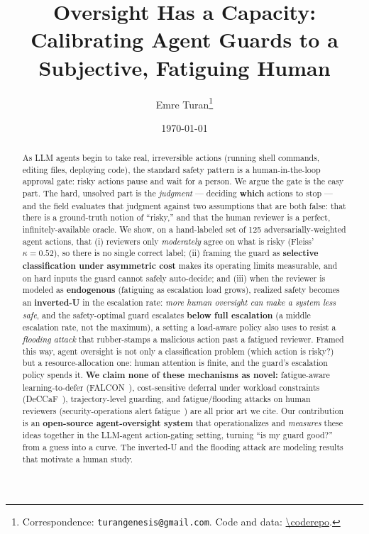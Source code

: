 \documentclass[11pt]{article}
\title{\textbf{Oversight Has a Capacity:\\ Calibrating Agent Guards to a Subjective, Fatiguing Human}}
\author{Emre Turan\thanks{Correspondence: \texttt{turangenesis@gmail.com}. Code and data: \url{\coderepo}.}}
\affil{Independent Researcher}
\date{\today}
\begin{document}
\maketitle

\begin{abstract}
As LLM agents begin to take real, irreversible actions (running shell commands, editing files,
deploying code), the standard safety pattern is a human-in-the-loop approval gate: risky actions
pause and wait for a person. We argue the gate is the easy part. The hard, unsolved part is the
\emph{judgment} --- deciding \textbf{which} actions to stop --- and the field evaluates that judgment
against two assumptions that are both false: that there is a ground-truth notion of ``risky,'' and
that the human reviewer is a perfect, infinitely-available oracle. We show, on a hand-labeled set of
125 adversarially-weighted agent actions, that (i) reviewers only \emph{moderately} agree on what is
risky (Fleiss' $\kappa = 0.52$), so there is no single correct label; (ii) framing the guard as
\textbf{selective classification under asymmetric cost} makes its operating limits measurable, and on
hard inputs the guard cannot safely auto-decide; and (iii) when the reviewer is modeled as
\textbf{endogenous} (fatiguing as escalation load grows), realized safety becomes an
\textbf{inverted-U} in the escalation rate: \emph{more human oversight can make a system less safe},
and the safety-optimal guard escalates \textbf{below full escalation} (a middle escalation rate, not
the maximum), a setting a load-aware policy also uses to resist a \emph{flooding attack} that
rubber-stamps a malicious action past a fatigued reviewer. Framed this way, agent oversight is not
only a classification problem (which action is risky?) but a resource-allocation one: human attention
is finite, and the guard's escalation policy spends it. \textbf{We claim none of these mechanisms
as novel:} fatigue-aware learning-to-defer (FALCON~\cite{falcon}), cost-sensitive deferral under workload
constraints (DeCCaF~\cite{deccaf}),
trajectory-level guarding, and fatigue/flooding attacks on human reviewers (security-operations alert
fatigue~\cite{tariq25}) are all prior art we cite. Our contribution is an \textbf{open-source
agent-oversight system} that operationalizes and \emph{measures} these ideas together in the
LLM-agent action-gating setting, turning ``is my guard good?'' from a guess into a curve. The
inverted-U and the flooding attack are modeling results that motivate a human study.
\end{abstract}
\end{document}
